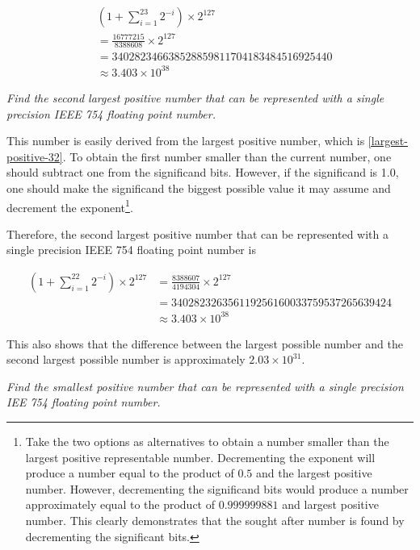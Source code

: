 \documentclass[oneside]{book}
\begin{document}
\begin{align}
    &\left(1 + \sum_{i=1}^{23} 2^{-i}\right) \times 2^{127} \nonumber \\
    &= \frac{16777215}{8388608} \times 2^{127} \nonumber \\
    &= 340282346638528859811704183484516925440 \label{largest-positive-32} \\
    &\approx 3.403 \times 10^{38} \nonumber
\end{align}

\textit{Find the second largest positive number that can be represented with a
single precision IEEE 754 floating point number.}

This number is easily derived from the largest positive number, which is
\ref{largest-positive-32}. To obtain the first number smaller than the current
number, one should subtract one from the significand bits. However, if the
significand is 1.0, one should make the significand the biggest possible value
it may assume and decrement the exponent\footnote{Take the two options as
alternatives to obtain a number smaller than the largest positive representable
number. Decrementing the exponent will produce a number equal to the product of
\(0.5\) and the largest positive number. However, decrementing the significand
bits would produce a number approximately equal to the product of
\(0.999999881\) and largest positive number. This clearly demonstrates that the
sought after number is found by decrementing the significant bits.}.

Therefore, the second largest positive number that can be represented with a
single precision IEEE 754 floating point number is

\begin{align}
    \left(1 + \sum_{i=1}^{22} 2^{-i}\right) \times 2^{127}
    &= \frac{8388607}{4194304} \times 2^{127} \nonumber \\
    &= 340282326356119256160033759537265639424 \nonumber \\
    &\approx 3.403 \times 10^{38} \nonumber
\end{align}

This also shows that the difference between the largest possible number and the
second largest possible number is approximately \(2.03 \times 10^{31}\).

\textit{Find the smallest positive number that can be represented with a single
precision IEE 754 floating point number.}
\end{document}
